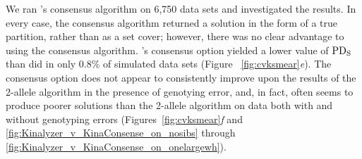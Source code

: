 We ran \kinalyzer{}'s consensus algorithm on 6,750 data sets and investigated the results.  In every 
case, the consensus algorithm returned a solution in the form of a true partition, rather than as a set 
cover; however, there was no clear advantage to using the consensus algorithm. \kinalyzer{}'s consensus 
option yielded a lower value of $\mathrm{PD_S}$ than \colony{} did in only 0.8\% of simulated data sets (Figure~
\ref{fig:cvksmear}{\em e}).  The consensus option does not appear to consistently  improve upon the 
results of the 2-allele algorithm in the presence of genotying error, and, in fact, often seems to 
produce poorer solutions than the 2-allele algorithm on data both with and without genotyping errors 
(Figures~\ref{fig:cvksmear}{\em f} and \ref{fig:Kinalyzer_v_KinaConsense_on_nosibs} through 
\ref{fig:Kinalyzer_v_KinaConsense_on_onelargewh}). 

